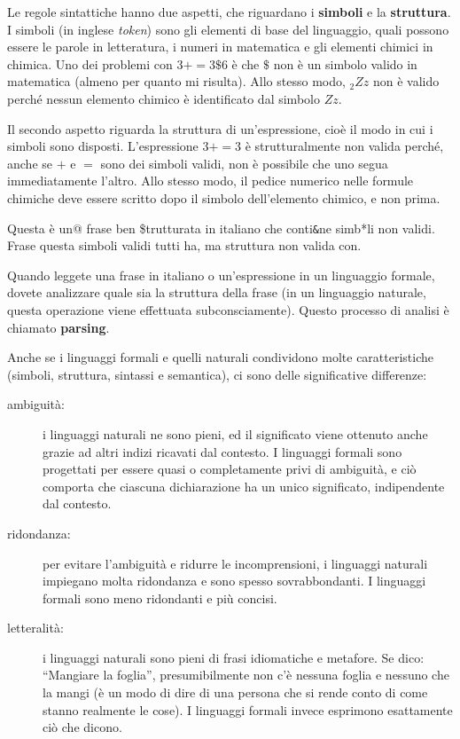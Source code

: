 \documentclass[10pt]{book}
\begin{document}
Le regole sintattiche hanno due aspetti, che riguardano i {\bf simboli} e la
{\bf struttura}. I simboli (in inglese {\em token}) sono gli elementi di base del linguaggio, quali possono essere le parole in letteratura, i numeri in matematica e gli elementi chimici in chimica. Uno dei problemi con 
$3 += 3 \$ 6$ è che \( \$ \) non è un simbolo valido in matematica
(almeno per quanto mi risulta). Allo stesso modo, $_2Zz$ non è valido perché nessun elemento chimico è identificato dal simbolo $Zz$.

Il secondo aspetto riguarda la struttura di un'espressione, cioè il modo in cui i simboli sono disposti. L'espressione
$3 += 3$ è strutturalmente non valida perché, anche se $+$ e $=$ sono dei simboli validi, non è possibile che uno segua immediatamente l'altro. Allo stesso modo, il pedice numerico nelle formule chimiche deve essere scritto dopo il simbolo dell'elemento chimico, e non prima.

Questa è un@ frase ben \$trutturata in italiano che conti\verb'&'ne simb*li non validi.\\
Frase questa simboli validi tutti ha, ma struttura non valida con.

Quando leggete una frase in italiano o un'espressione in un linguaggio formale, dovete analizzare quale sia la struttura della frase (in un linguaggio naturale, questa operazione viene effettuata subconsciamente). Questo processo di analisi è chiamato {\bf parsing}.

Anche se i linguaggi formali e quelli naturali condividono molte    caratteristiche (simboli, struttura, sintassi e semantica), ci sono delle   significative differenze:

\begin{description}

\item[ambiguità:] i linguaggi naturali ne sono pieni, ed il significato viene   ottenuto anche grazie ad altri indizi ricavati dal contesto. I linguaggi formali sono progettati per essere quasi o completamente privi di ambiguità, e ciò comporta che ciascuna dichiarazione ha un unico significato, indipendente dal contesto.

\item[ridondanza:] per evitare l'ambiguità e ridurre le incomprensioni, i linguaggi naturali impiegano molta ridondanza e sono spesso sovrabbondanti. I linguaggi formali sono meno ridondanti e più concisi.

\item[letteralità:] i linguaggi naturali sono pieni di frasi idiomatiche e metafore. Se dico: ``Mangiare la foglia'', presumibilmente non c'è nessuna foglia e nessuno che la mangi (è un modo di dire di una persona che si rende conto di come stanno realmente le cose). I linguaggi formali invece esprimono esattamente ciò che dicono.

\end{description}
\end{document}
